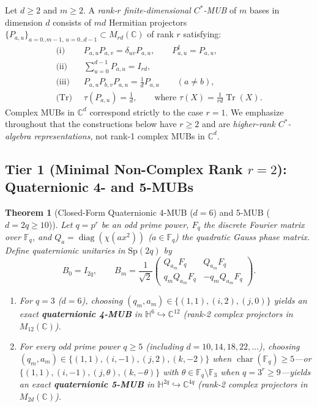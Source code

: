 \documentclass[11pt,a4paper]{article}
\newtheorem{theorem}{Theorem}[section]
\theoremstyle{definition}
\newcommand{\C}{\mathbb{C}}
\newcommand{\HH}{\mathbb{H}}
\newcommand{\F}{\mathbb{F}}
\newcommand{\Tr}{\operatorname{Tr}}
\begin{document}
Let $d \ge 2$ and $m \ge 2$. A \emph{rank-$r$ finite-dimensional $C^*$-MUB} of $m$ bases in dimension $d$ consists of $m d$ Hermitian projectors $\{P_{a,u}\}_{a=0..m-1,\, u=0..d-1} \subset M_{rd}(\C)$ of rank $r$ satisfying:
\begin{align}
  \text{(i)}\;\; & P_{a,u} P_{a,v} = \delta_{uv} P_{a,u}, \qquad P_{a,u}^\dagger = P_{a,u}, \label{eq:ax-i}\\
  \text{(ii)}\;\; & \sum_{u=0}^{d-1} P_{a,u} = I_{rd}, \label{eq:ax-ii}\\
  \text{(iii)}\;\; & P_{a,u} P_{b,v} P_{a,u} = \frac{1}{d} P_{a,u} \qquad (a \ne b), \label{eq:ax-iii}\\
  \text{(Tr)}\;\; & \tau(P_{a,u}) = \frac{1}{d}, \qquad \text{where } \tau(X) = \frac{1}{rd}\Tr(X). \label{eq:ax-tr}
\end{align}
Complex MUBs in $\C^d$ correspond strictly to the case $r = 1$. We emphasize throughout that the constructions below have $r \ge 2$ and are \emph{higher-rank $C^*$-algebra representations}, not rank-1 complex MUBs in $\C^d$.

\subsection{Tier 1 (Minimal Non-Complex Rank $r=2$): Quaternionic 4- and 5-MUBs}

\begin{theorem}[Closed-Form Quaternionic 4-MUB ($d=6$) and 5-MUB ($d=2q \ge 10$)]
\label{thm:quat}
Let $q = p^r$ be an odd prime power, $F_q$ the discrete Fourier matrix over $\F_q$, and $Q_a = \operatorname{diag}(\chi(a x^2))$ ($a \in \F_q$) the quadratic Gauss phase matrix. Define quaternionic unitaries in $\mathrm{Sp}(2q)$ by
\[
  B_0 = I_{2q}, \qquad
  B_m = \frac{1}{\sqrt{2}} \begin{pmatrix} Q_{a_m} F_q & Q_{a_m} F_q \\ q_m Q_{a_m} F_q & -q_m Q_{a_m} F_q \end{pmatrix}.
\]
\begin{enumerate}
  \item For $q = 3$ ($d = 6$), choosing $(q_m, a_m) \in \{(1,1), (i,2), (j,0)\}$ yields an exact \textbf{quaternionic 4-MUB} in $\HH^6 \hookrightarrow \C^{12}$ (rank-2 complex projectors in $M_{12}(\C)$).
  \item For every odd prime power $q \ge 5$ (including $d = 10, 14, 18, 22, \dots$), choosing $(q_m, a_m) \in \{(1,1), (i,-1), (j,2), (k,-2)\}$ when $\operatorname{char}(\F_q) \ge 5$---or $\{(1,1), (i,-1), (j,\theta), (k,-\theta)\}$ with $\theta \in \F_q \setminus \F_3$ when $q = 3^r \ge 9$---yields an exact \textbf{quaternionic 5-MUB} in $\HH^{2q} \hookrightarrow \C^{4q}$ (rank-2 complex projectors in $M_{2d}(\C)$).
\end{enumerate}
\end{theorem}
\end{document}
